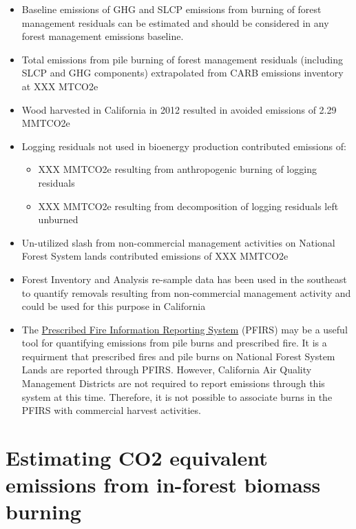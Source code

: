 \documentclass[a4paper]{article}
\begin{document}
\begin{itemize}
\item Baseline emissions of GHG and SLCP emissions from burning of forest
management residuals can be estimated and should be considered in
any forest management emissions baseline.

\item Total emissions from pile burning of forest management residuals
(including SLCP and GHG components) extrapolated from CARB emissions
inventory at XXX MTCO2e

\item Wood harvested in California in 2012 resulted in avoided emissions of
2.29 MMTCO2e

\item Logging residuals not used in bioenergy production contributed
emissions of:
\begin{itemize}
\item XXX MMTCO2e resulting from anthropogenic burning of logging residuals

\item XXX MMTCO2e resulting from decomposition of logging residuals left
unburned
\end{itemize}

\item Un-utilized slash from non-commercial management activities on
National Forest System lands contributed emissions of XXX MMTCO2e

\item Forest Inventory and Analysis re-sample data has been used in the
southeast to quantify removals resulting from non-commercial
management activity and could be used for this purpose in California

\item The \href{https://ssl.arb.ca.gov/pfirs/}{Prescribed Fire Information Reporting System} (PFIRS) may be a useful tool for quantifying
emissions from pile burns and prescribed fire. It is a requirment that prescribed fires and pile
burns on National Forest System Lands are reported through PFIRS. However, California Air Quality Management
Districts are not required to report emissions through this system at this time. Therefore, it is not possible to associate burns in the PFIRS with commercial harvest activities.
\end{itemize}

\section{Estimating CO2 equivalent emissions from in-forest biomass burning}
\label{sec-2}
\end{document}
